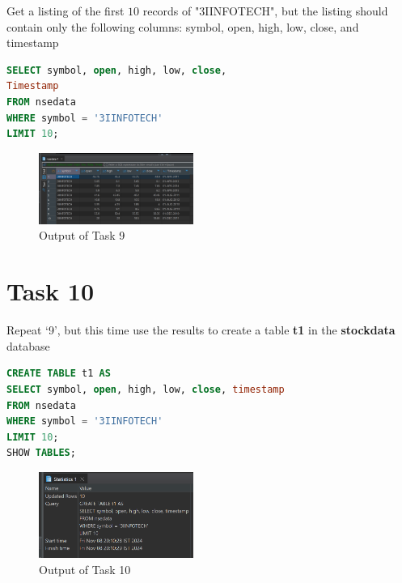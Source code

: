 \documentclass{article}
\begin{document}
\begin{task*}[9]
Get a listing of the first $10$ records of "3IINFOTECH", but the listing should contain only the following columns: symbol, open, high, low, close, and timestamp
\end{task*}

\begin{lstlisting}[language=SQL, caption=Displaying the First 10 Records for 3IINFOTECH]
SELECT symbol, open, high, low, close,
Timestamp
FROM nsedata
WHERE symbol = '3IINFOTECH'
LIMIT 10;
\end{lstlisting}

\begin{figure}[H]
	\centering
	\includegraphics[width=0.45\textwidth]{Images/Task9.png}
	\caption{Output of Task 9}
\end{figure}

\clearpage

\section*{Task 10}

\begin{task*}[10]
Repeat `9', but this time use the results to create a table \textbf{t1} in the \textbf{stockdata} database
\end{task*}

\begin{lstlisting}[language=SQL, caption=Creating Table t1]
CREATE TABLE t1 AS
SELECT symbol, open, high, low, close, timestamp
FROM nsedata
WHERE symbol = '3IINFOTECH'
LIMIT 10;
SHOW TABLES;
\end{lstlisting}

\begin{figure}[H]
	\centering
	\includegraphics[width=0.45\textwidth]{Images/Task10-1.png}
	\caption{Output of Task 10}
\end{figure}
\end{document}
